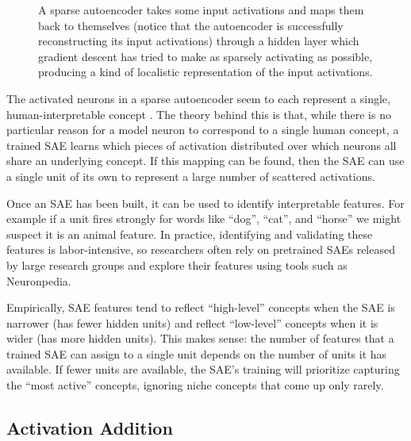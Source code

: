 \begin{figure}[ht]
\centering
{}
\caption[Simbrain screenshot from Jeff Yoshimi.]{ A sparse autoencoder takes
      some input activations and maps them back to themselves (notice that the
      autoencoder is successfully reconstructing its input activations) through
      a hidden layer which gradient descent has tried to make as sparsely
      activating as possible, producing a kind of localistic representation of
      the input activations. }
\label{saeSimbrain}
\end{figure}

The activated neurons in a sparse autoencoder seem to each represent a single,
human-interpretable concept \cite{cunningham2023sparse,
bricken2023monosemanticity}. The theory behind this is that, while there is no
particular reason for a model neuron to correspond to a single human concept, a
trained SAE learns which pieces of activation distributed over which neurons
all share an underlying concept. If this mapping can be found, then the SAE can
use a single unit of its own to represent a large number of scattered
activations.

Once an SAE has been built, it can be used to identify interpretable features. For example if a unit fires strongly for words like ``dog'', ``cat'', and ``horse'' we might suspect it is an animal feature. In practice, identifying and validating these features is labor-intensive, so researchers often rely on pretrained SAEs released by large research groups and explore their features using tools such as Neuronpedia.



Empirically, SAE features tend to reflect ``high-level'' concepts when the SAE
is narrower (has fewer hidden units) and reflect ``low-level'' concepts when it
is wider (has more hidden units). This makes sense: the number of features that
a trained SAE can assign to a single unit depends on the number of units it has
available. If fewer units are available, the SAE's training will prioritize
capturing the ``most active'' concepts, ignoring niche concepts that come up
only rarely.

\subsection{Activation Addition}\label{activationAddition}

